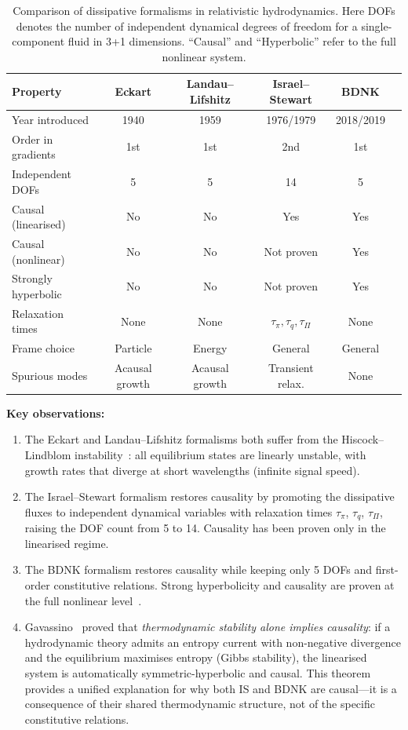 \begin{table}[htbp]
\centering
\caption{Comparison of dissipative formalisms in relativistic
  hydrodynamics.  Here DOFs denotes the number of independent dynamical
  degrees of freedom for a single-component fluid in 3+1 dimensions.
  ``Causal'' and ``Hyperbolic'' refer to the full nonlinear system.}
\label{tab:formalism-comparison}
\medskip
\begin{tabular}{@{}l c c c c c@{}}
\toprule
Property & Eckart & Landau--Lifshitz & Israel--Stewart & BDNK \\
\midrule
Year introduced & 1940 & 1959 & 1976/1979 & 2018/2019 \\
Order in gradients & 1st & 1st & 2nd & 1st \\
Independent DOFs & 5 & 5 & 14 & 5 \\
Causal (linearised) & No & No & Yes & Yes \\
Causal (nonlinear) & No & No & Not proven & Yes \\
Strongly hyperbolic & No & No & Not proven & Yes \\
Relaxation times & None & None & $\tau_\pi,\tau_q,\tau_\Pi$ & None \\
Frame choice & Particle & Energy & General & General \\
Spurious modes & Acausal growth & Acausal growth & Transient relax. & None \\
\bottomrule
\end{tabular}
\end{table}

\noindent\textbf{Key observations:}
\begin{enumerate}
\item The Eckart and Landau--Lifshitz formalisms both suffer from the
  Hiscock--Lindblom instability~\cite{HiscockLindblom1985}: all
  equilibrium states are linearly unstable, with growth rates that
  diverge at short wavelengths (infinite signal speed).

\item The Israel--Stewart formalism restores causality by promoting the
  dissipative fluxes to independent dynamical variables with relaxation
  times $\tau_\pi$, $\tau_q$, $\tau_\Pi$, raising the DOF count from 5
  to 14.  Causality has been proven only in the linearised regime.

\item The BDNK formalism restores causality while keeping only 5 DOFs
  and first-order constitutive relations.  Strong hyperbolicity and
  causality are proven at the full nonlinear level~\cite{BemficaDN2019,
  BemficaDNK2023ideal}.

\item Gavassino~\cite{GavassinoCausality2021} proved that
  \emph{thermodynamic stability alone implies causality}: if a
  hydrodynamic theory admits an entropy current with non-negative
  divergence and the equilibrium maximises entropy (Gibbs stability),
  the linearised system is automatically symmetric-hyperbolic and
  causal.  This theorem provides a unified explanation for why both
  IS and BDNK are causal---it is a consequence of their shared
  thermodynamic structure, not of the specific constitutive relations.
\end{enumerate}

